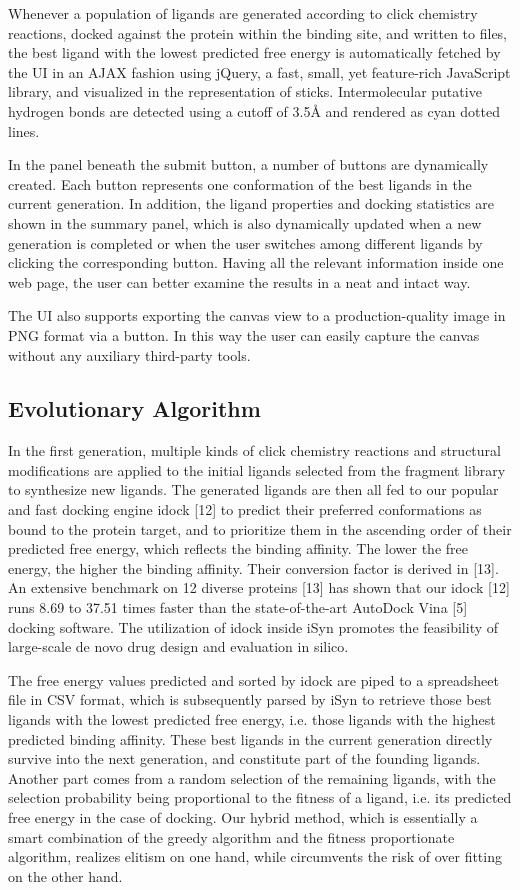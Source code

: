 Whenever a population of ligands are generated according to click chemistry reactions, docked against the protein within the binding site, and written to files, the best ligand with the lowest predicted free energy is automatically fetched by the UI in an AJAX fashion using jQuery, a fast, small, yet feature-rich JavaScript library, and visualized in the representation of sticks. Intermolecular putative hydrogen bonds are detected using a cutoff of 3.5Å and rendered as cyan dotted lines.

In the panel beneath the submit button, a number of buttons are dynamically created. Each button represents one conformation of the best ligands in the current generation. In addition, the ligand properties and docking statistics are shown in the summary panel, which is also dynamically updated when a new generation is completed or when the user switches among different ligands by clicking the corresponding button. Having all the relevant information inside one web page, the user can better examine the results in a neat and intact way.

The UI also supports exporting the canvas view to a production-quality image in PNG format via a button. In this way the user can easily capture the canvas without any auxiliary third-party tools.

\subsection{Evolutionary Algorithm}

In the first generation, multiple kinds of click chemistry reactions and structural modifications are applied to the initial ligands selected from the fragment library to synthesize new ligands. The generated ligands are then all fed to our popular and fast docking engine idock [12] to predict their preferred conformations as bound to the protein target, and to prioritize them in the ascending order of their predicted free energy, which reflects the binding affinity. The lower the free energy, the higher the binding affinity. Their conversion factor is derived in [13]. An extensive benchmark on 12 diverse proteins [13] has shown that our idock [12] runs 8.69 to 37.51 times faster than the state-of-the-art AutoDock Vina [5] docking software. The utilization of idock inside iSyn promotes the feasibility of large-scale de novo drug design and evaluation in silico.

The free energy values predicted and sorted by idock are piped to a spreadsheet file in CSV format, which is subsequently parsed by iSyn to retrieve those best ligands with the lowest predicted free energy, i.e. those ligands with the highest predicted binding affinity. These best ligands in the current generation directly survive into the next generation, and constitute part of the founding ligands. Another part comes from a random selection of the remaining ligands, with the selection probability being proportional to the fitness of a ligand, i.e. its predicted free energy in the case of docking. Our hybrid method, which is essentially a smart combination of the greedy algorithm and the fitness proportionate algorithm, realizes elitism on one hand, while circumvents the risk of over fitting on the other hand.

